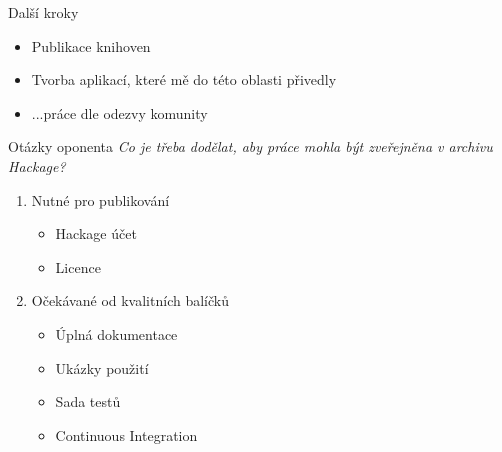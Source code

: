 \documentclass[presentation]{beamer}
\begin{document}
\begin{frame}{Další kroky}
  \begin{itemize}
    \item Publikace knihoven
    \item Tvorba aplikací, které mě do této oblasti přivedly
    \item ...práce dle odezvy komunity
  \end{itemize}
\end{frame}


\appendix
\begin{frame}{Otázky oponenta}
  \emph{Co je třeba dodělat, aby práce mohla být zveřejněna v archivu Hackage?}
  \medskip
  \begin{enumerate}
    \item Nutné pro publikování
      \begin{itemize}
        \item Hackage účet
        \item Licence
      \end{itemize}
    \item Očekávané od kvalitních balíčků
      \begin{itemize}
        \item Úplná dokumentace
        \item Ukázky použití
        \item Sada testů
        \item Continuous Integration
      \end{itemize}
  \end{enumerate}
\end{frame}
\end{document}
